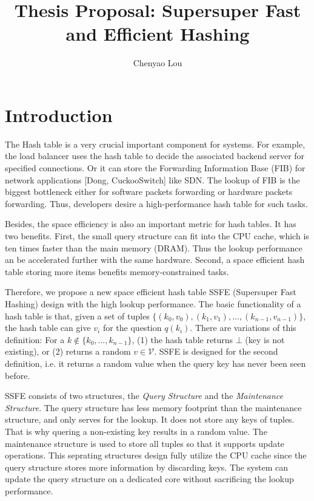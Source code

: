 \documentclass{article}
\title{Thesis Proposal: Supersuper Fast and Efficient Hashing}
\author{Chenyao Lou}
\begin{document}
\maketitle

\section{Introduction}


The Hash table is a very crucial important component for systems. For example, the load balancer uses the hash table to decide the associated backend server for specified connections. Or it can store the Forwarding Information Base (FIB) for network applications [Dong, CuckooSwitch] like SDN. The lookup of FIB is the biggest bottleneck either for software packets forwarding or hardware packets forwarding. Thus, developers desire a high-performance hash table for such tasks.

Besides, the space efficiency is also an important metric for hash tables. It has two benefits. First, the small query structure can fit into the CPU cache, which is ten times faster than the main memory (DRAM). Thus the lookup performance an be accelerated further with the same hardware. Second, a space efficient hash table storing more items benefits memory-constrained tasks.


Therefore, we propose a new space efficient hash table SSFE (Supersuper Fast Hashing) design with the high lookup performance. The basic functionality of a hash table is that, given a set of tuples $\{(k_0, v_0), (k_1, v_1), ..., (k_{n-1}, v_{n-1})\}$, the hash table can give $v_i$ for the question $q(k_i)$. There are variations of this definition: For a $k \not\in \{k_0, ..., k_{n-1}\}$, (1) the hash table returns $\bot$ (key is not existing), or (2) returns a random $v \in \mathcal{V}$. SSFE is designed for the second definition, i.e. it returns a random value when the query key has never been seen before.


SSFE consists of two structures, the \textit{Query Structure} and the \textit{Maintenance Structure}. The query structure has less memory footprint than the maintenance structure, and only serves for the lookup. It does not store any keys of tuples. That is why quering a non-existing key results in a random value. The maintenance structure is used to store all tuples so that it supports update operations. This seprating structures design fully utilize the CPU cache since the query structure stores more information by discarding keys. The system can update the query structure on a dedicated core without sacrificing the lookup performance.
\end{document}
